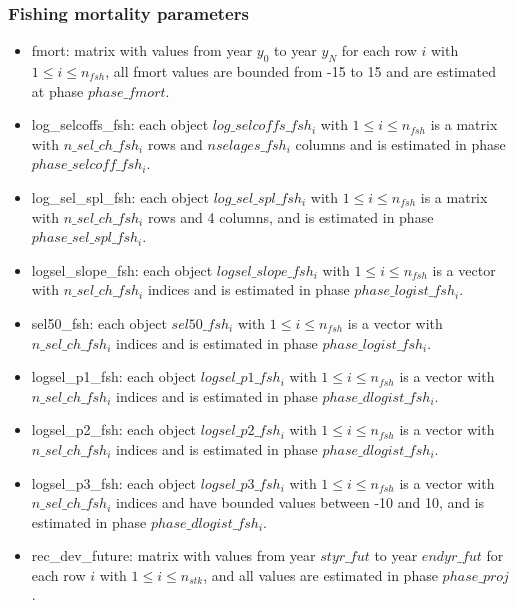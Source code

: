 \documentclass{article}
\begin{document}
\subsubsection{Fishing mortality parameters}
\begin{itemize}
   
    \item fmort: matrix with values from year $y_0$ to year $y_N$ for each row $i$ with $1\leq i \leq n_{fsh}$, all fmort values are bounded from -15 to 15 and are estimated at phase $phase\_fmort$.

    
    \item log\_selcoffs\_fsh: each object $log\_selcoffs\_fsh_i$ with $1\leq i \leq n_{fsh}$ is a matrix with $n\_sel\_ch\_fsh_i$ rows and $nselages\_fsh_i$ columns and is estimated in phase $phase\_selcoff\_fsh_i$.
    
   
    \item log\_sel\_spl\_fsh: each object $log\_sel\_spl\_fsh_i$ with $1\leq i \leq n_{fsh}$ is a matrix with $n\_sel\_ch\_fsh_i$ rows and 4 columns, and is estimated in phase $phase\_sel\_spl\_fsh_i$.
    

    \item logsel\_slope\_fsh: each object $logsel\_slope\_fsh_i$ with $1\leq i \leq n_{fsh}$ is a vector with $n\_sel\_ch\_fsh_i$ indices and is estimated in phase $phase\_logist\_fsh_i$.

   
    \item sel50\_fsh: each object $sel50\_fsh_i$ with $1\leq i\leq n_{fsh}$ is a vector with $n\_sel\_ch\_fsh_i$ indices and is estimated in phase $phase\_logist\_fsh_i$.

    
   
    \item logsel\_p1\_fsh: each object $logsel\_p1\_fsh_i$ with $1\leq i \leq n_{fsh}$ is a vector with $n\_sel\_ch\_fsh_i$ indices and is estimated in phase $phase\_dlogist\_fsh_i$.   


    \item logsel\_p2\_fsh: each object $logsel\_p2\_fsh_i$ with $1\leq i \leq n_{fsh}$ is a vector with $n\_sel\_ch\_fsh_i$ indices and is estimated in phase $phase\_dlogist\_fsh_i$.

    
    \item logsel\_p3\_fsh: each object $logsel\_p3\_fsh_i$ with $1\leq i \leq n_{fsh}$ is  a  vector with $n\_sel\_ch\_fsh_i$ indices and have bounded values between -10 and 10, and is estimated in phase $phase\_dlogist\_fsh_i$.
    
    
    \item rec\_dev\_future: matrix with values from year $styr\_fut$ to year $endyr\_fut$ for each row $i$ with $1\leq i \leq n_{stk}$, and all values are estimated in phase $phase\_proj$.
\end{itemize}
\end{document}
